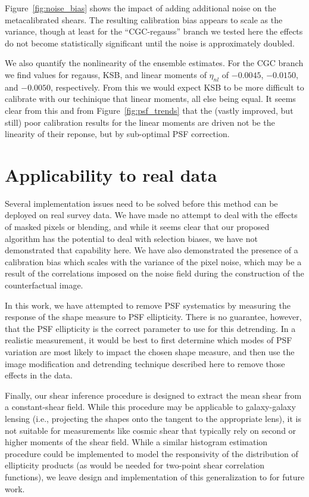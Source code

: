 \documentclass[iop]{emulateapj}
\begin{document}
Figure~\ref{fig:noise_bias} shows the impact of adding additional
noise on the metacalibrated shears. The resulting calibration bias
appears to scale as the variance, though at least for the
``CGC-regauss'' branch we tested here the effects do not become
statistically significant until the noise is approximately doubled.


We also quantify the nonlinearity of the ensemble estimates. For the
CGC branch we find values for regauss, KSB, and linear moments of
$\eta_{nl}$ of $-0.0045$, $-0.0150$, and $-0.0050$, respectively. From
this we would expect KSB to be more difficult to calibrate with our
techinique that linear moments, all else being equal. It seems clear
from this and from Figure~\ref{fig:psf_trends} that the (vastly improved,
but still) poor calibration results for the linear moments are driven
not be the linearity of their reponse, but by sub-optimal PSF
correction.

\section{Applicability to real data}
Several implementation issues need to be solved before this method can
be deployed on real survey data. We have made no attempt to deal with
the effects of masked pixels or blending, and while it seems clear
that our proposed algorithm has the potential to deal with selection
biases, we have not demonstrated that capability here. We have also
demonstrated the presence of a calibration bias which scales with the
variance of the pixel noise, which may be a result of the correlations
imposed on the noise field during the construction of the
counterfactual image.

In this work, we have attempted to remove PSF systematics by measuring
the response of the shape measure to PSF ellipticity. There is no
guarantee, however, that the PSF ellipticity is the correct parameter
to use for this detrending. In a realistic measurement, it would be
best to first determine which modes of PSF variation are most likely
to impact the chosen shape measure, and then use the image
modification and detrending technique described here to remove those
effects in the data.

Finally, our shear inference procedure is designed to extract the mean
shear from a constant-shear field. While this procedure may be
applicable to galaxy-galaxy lensing (i.e., projecting the shapes onto
the tangent to the appropriate lens), it is not suitable for
measurements like cosmic shear that typically rely on second or higher
moments of the shear field. While a similar histogram estimation
procedure could be implemented to model the responsivity of the
distribution of ellipticity products (as would be needed for two-point
shear correlation functions), we leave design and implementation of
this generalization to for future work.
\end{document}
